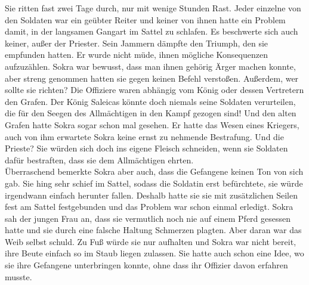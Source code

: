 Sie ritten fast zwei Tage durch, nur mit wenige Stunden Rast. Jeder einzelne von den Soldaten war 
ein geübter Reiter und keiner von ihnen hatte ein Problem damit, in der langsamen Gangart im Sattel 
zu schlafen. Es beschwerte sich auch keiner, außer der Priester. Sein Jammern dämpfte den Triumph, 
den sie empfunden hatten. Er wurde nicht müde, ihnen mögliche Konsequenzen aufzuzählen. Sokra war 
bewusst, dass man ihnen gehörig Ärger machen konnte, aber streng genommen hatten sie gegen keinen 
Befehl verstoßen. Außerdem, wer sollte sie richten? Die Offiziere waren abhängig vom König oder 
dessen Vertretern den Grafen. Der König Saleicas könnte doch niemals seine Soldaten verurteilen, 
die für den Seegen des Allmächtigen in den Kampf gezogen sind! Und den alten Grafen hatte Sokra 
sogar schon mal gesehen. Er hatte das Wesen eines Kriegers, auch von ihm erwartete Sokra keine 
ernst zu nehmende Bestrafung. Und die Prieste? Sie würden sich doch ins eigene Fleisch schneiden, 
wenn sie Soldaten dafür bestraften, dass sie dem Allmächtigen ehrten.\\
Überraschend bemerkte Sokra aber auch, dass die Gefangene keinen Ton von sich gab. Sie hing sehr 
schief im Sattel, sodass die Soldatin erst befürchtete, sie würde irgendwann einfach herunter 
fallen. Deshalb hatte sie sie mit zusätzlichen Seilen fest am Sattel festgebunden und das Problem 
war schon einmal erledigt. Sokra sah der jungen Frau an, dass sie vermutlich noch nie auf einem 
Pferd gesessen hatte und sie durch eine falsche Haltung Schmerzen plagten. Aber daran war das Weib 
selbst schuld. Zu Fuß würde sie nur aufhalten und Sokra war nicht bereit, ihre Beute einfach so im 
Staub liegen zulassen. Sie hatte auch schon eine Idee, wo sie ihre Gefangene unterbringen konnte, 
ohne dass ihr Offizier davon erfahren musste.\\

